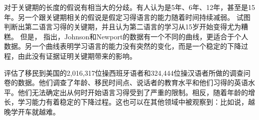 对于关键期的长度的假说有相当大的分歧。有人认为是5年、6年、12年，甚至是15年\citep[]{HBW2003a}。另一个跟关键期相关的假说是假定习得语言的能力随着时间持续减弱。
 \citet{JN89a}试图判断出第二语言习得的关键期，并且认为第二语言的学习从15岁开始变得尤为糟糕。\nocite{Sorace2003a}
但是， \citet*[\page]{EBJKSPP96a}指出，Johnson和Newport的数据有一个不同的曲线，更适合于个人数据。另一个曲线表明学习语言的能力没有突然的变化，而是一个稳定的下降过程，由此没有证据证明关键期带来的影响。

 \citet*{HBW2003a}评估了移民到美国的2,016,317位操西班牙语者和324,444位操汉语者所做的调查问卷的数据。他们调查了年龄、移民时间点、说话者的教育水平和他们习得的英语水平。他们无法确定出从何时开始语言习得受到了严重的限制。相反，随着年龄的增长，学习能力有着稳定的下降过程。这也可以在其他领域中被观察到：比如说，越晚学开车就越难。


